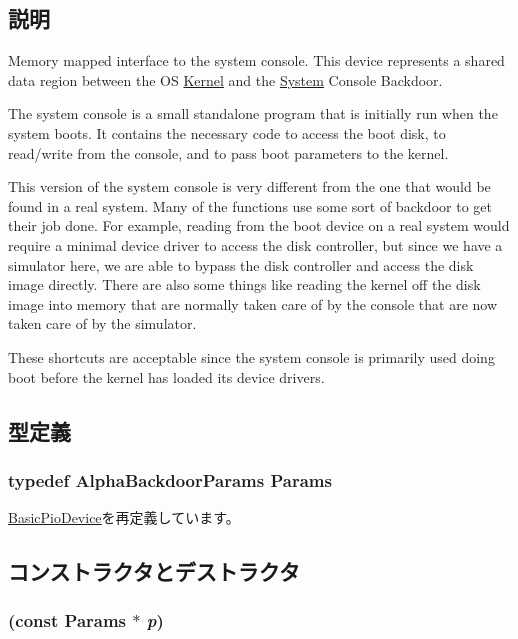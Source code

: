 \subsection{説明}
Memory mapped interface to the system console. This device represents a shared data region between the OS \hyperlink{namespaceKernel}{Kernel} and the \hyperlink{classSystem}{System} Console Backdoor.

The system console is a small standalone program that is initially run when the system boots. It contains the necessary code to access the boot disk, to read/write from the console, and to pass boot parameters to the kernel.

This version of the system console is very different from the one that would be found in a real system. Many of the functions use some sort of backdoor to get their job done. For example, reading from the boot device on a real system would require a minimal device driver to access the disk controller, but since we have a simulator here, we are able to bypass the disk controller and access the disk image directly. There are also some things like reading the kernel off the disk image into memory that are normally taken care of by the console that are now taken care of by the simulator.

These shortcuts are acceptable since the system console is primarily used doing boot before the kernel has loaded its device drivers. 

\subsection{型定義}
\hypertarget{classAlphaBackdoor_a3311d1ef17b579d409e4cf342f9c696f}{
\subsubsection[{Params}]{\setlength{\rightskip}{0pt plus 5cm}typedef AlphaBackdoorParams {\bf Params}}}
\label{classAlphaBackdoor_a3311d1ef17b579d409e4cf342f9c696f}


\hyperlink{classBasicPioDevice_a2845515ac6467f10540747053c8a0449}{BasicPioDevice}を再定義しています。

\subsection{コンストラクタとデストラクタ}
\hypertarget{classAlphaBackdoor_aa3df553820be57af9fef79cf8c933afa}{
\subsubsection[{AlphaBackdoor}]{ (const {\bf Params} $\ast$ {\em p})}}
\label{classAlphaBackdoor_aa3df553820be57af9fef79cf8c933afa}



